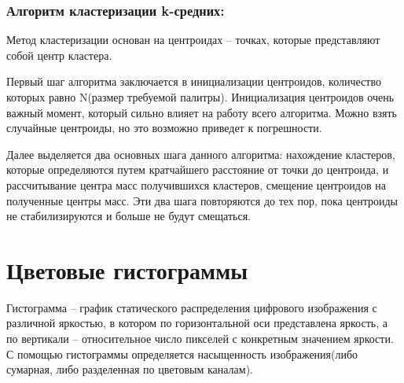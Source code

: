 \subsubsection{Алгоритм кластеризации k-средних:}
Метод кластеризации основан на центроидах -- точках, которые представляют собой центр кластера.

Первый шаг алгоритма заключается в инициализации центроидов, количество которых равно N(размер требуемой палитры). Инициализация центроидов очень важный момент, который сильно влияет на работу всего алгоритма. Можно взять случайные центроиды, но это возможно приведет к погрешности.

Далее выделяется два основных шага данного алгоритма: нахождение кластеров, которые определяются путем кратчайшего расстояние от точки до центроида, и рассчитывание центра масс получившихся кластеров, смещение центроидов на полученные центры масс. Эти два шага повторяются до тех пор, пока центроиды не стабилизируются и больше не будут смещаться.

\begin{figure}[ht!]
\end{figure}

\section{ Цветовые гистограммы}
Гистограмма -- график статического распределения цифрового изображения с различной яркостью, в котором по горизонтальной оси представлена яркость, а по вертикали -- относительное число пикселей с конкретным значением яркости. С помощью гистограммы определяется насыщенность изображения(либо сумарная, либо разделенная по цветовым каналам).

